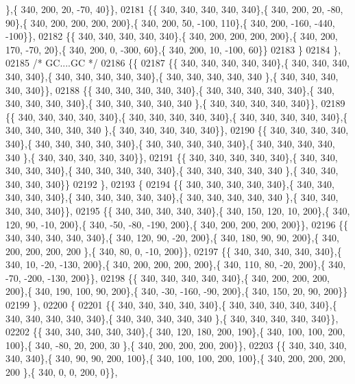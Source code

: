 \begin{DoxyCode}
      \},\{ 340, 200,  20, -70,  40\}\},
02181 \{\{ 340, 340, 340, 340, 340\},\{ 340, 200,  20, -80,  90\},\{ 340, 200, 200, 200, 200\},\{ 340, 200,  50, -100, 
      110\},\{ 340, 200, -160, -440, -100\}\},
02182 \{\{ 340, 340, 340, 340, 340\},\{ 340, 200, 200, 200, 200\},\{ 340, 200, 170, -70,  20\},\{ 340, 200,   0, -300,  
      60\},\{ 340, 200,  10, -100,  60\}\}
02183 \}
02184 \},
02185 \textcolor{comment}{/* GC....GC */}
02186 \{\{
02187 \{\{ 340, 340, 340, 340, 340\},\{ 340, 340, 340, 340, 340\},\{ 340, 340, 340, 340, 340\},\{ 340, 340, 340, 340, 340
      \},\{ 340, 340, 340, 340, 340\}\},
02188 \{\{ 340, 340, 340, 340, 340\},\{ 340, 340, 340, 340, 340\},\{ 340, 340, 340, 340, 340\},\{ 340, 340, 340, 340, 340
      \},\{ 340, 340, 340, 340, 340\}\},
02189 \{\{ 340, 340, 340, 340, 340\},\{ 340, 340, 340, 340, 340\},\{ 340, 340, 340, 340, 340\},\{ 340, 340, 340, 340, 340
      \},\{ 340, 340, 340, 340, 340\}\},
02190 \{\{ 340, 340, 340, 340, 340\},\{ 340, 340, 340, 340, 340\},\{ 340, 340, 340, 340, 340\},\{ 340, 340, 340, 340, 340
      \},\{ 340, 340, 340, 340, 340\}\},
02191 \{\{ 340, 340, 340, 340, 340\},\{ 340, 340, 340, 340, 340\},\{ 340, 340, 340, 340, 340\},\{ 340, 340, 340, 340, 340
      \},\{ 340, 340, 340, 340, 340\}\}
02192 \},
02193 \{
02194 \{\{ 340, 340, 340, 340, 340\},\{ 340, 340, 340, 340, 340\},\{ 340, 340, 340, 340, 340\},\{ 340, 340, 340, 340, 340
      \},\{ 340, 340, 340, 340, 340\}\},
02195 \{\{ 340, 340, 340, 340, 340\},\{ 340, 150, 120,  10, 200\},\{ 340, 120,  90, -10, 200\},\{ 340, -50, -80, -190, 
      200\},\{ 340, 200, 200, 200, 200\}\},
02196 \{\{ 340, 340, 340, 340, 340\},\{ 340, 120,  90, -20, 200\},\{ 340, 180,  90,  90, 200\},\{ 340, 200, 200, 200, 200
      \},\{ 340,  80,   0, -10, 200\}\},
02197 \{\{ 340, 340, 340, 340, 340\},\{ 340,  10, -20, -130, 200\},\{ 340, 200, 200, 200, 200\},\{ 340, 110,  80, -20, 
      200\},\{ 340, -70, -200, -130, 200\}\},
02198 \{\{ 340, 340, 340, 340, 340\},\{ 340, 200, 200, 200, 200\},\{ 340, 190, 100,  90, 200\},\{ 340, -30, -160, -90, 
      200\},\{ 340, 150,  20,  90, 200\}\}
02199 \},
02200 \{
02201 \{\{ 340, 340, 340, 340, 340\},\{ 340, 340, 340, 340, 340\},\{ 340, 340, 340, 340, 340\},\{ 340, 340, 340, 340, 340
      \},\{ 340, 340, 340, 340, 340\}\},
02202 \{\{ 340, 340, 340, 340, 340\},\{ 340, 120, 180, 200, 190\},\{ 340, 100, 100, 200, 100\},\{ 340, -80,  20, 200,  30
      \},\{ 340, 200, 200, 200, 200\}\},
02203 \{\{ 340, 340, 340, 340, 340\},\{ 340,  90,  90, 200, 100\},\{ 340, 100, 100, 200, 100\},\{ 340, 200, 200, 200, 200
      \},\{ 340,   0,   0, 200,   0\}\},

\end{DoxyCode}
